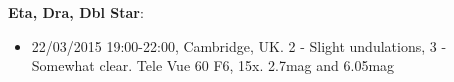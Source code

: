 {\bf Eta, Dra, Dbl Star}:
\begin{itemize}
\item 22/03/2015 19:00-22:00, Cambridge, UK. 2 - Slight undulations, 3 - Somewhat clear. Tele Vue 60 F6, 15x. 2.7mag and 6.05mag
\end{itemize}
